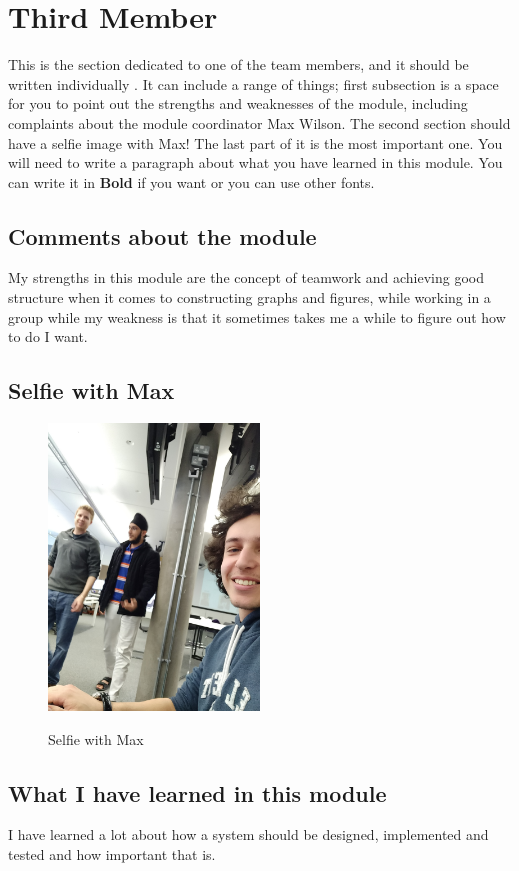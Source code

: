 \section{Third Member}
This is the section dedicated to one of the team members, and it should be written individually . It can include a range of things; first subsection is a space for you to point out the strengths and weaknesses of the module, including complaints about the module coordinator Max Wilson. The second section should have a selfie image with Max! The last part of it is the most important one. You will need to write a paragraph about what you have learned in this module. You can write it in \textbf{Bold} if you want or you can use other fonts. 


\subsection{Comments about the module}

My strengths in this module are the concept of teamwork and achieving good structure when it comes to constructing graphs and figures, while working in a group while my weakness is that it sometimes takes me a while to figure out how to do I want.


\subsection{Selfie with Max}

\begin{figure}[h]
\caption{Selfie with Max}
\centering
\includegraphics[width=0.5\textwidth]{selfie_with_Max.jpg}
\label{fig:selfie}
\end{figure}


\subsection{What I have learned in this module}

I have learned a lot about how a system should be designed, implemented and tested and how important that is.


